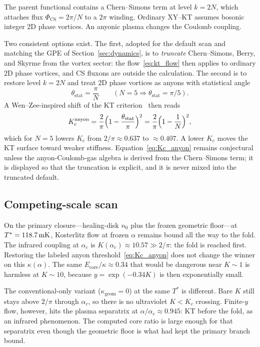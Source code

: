 The parent functional contains a Chern--Simons term at level $k=2N$, which attaches flux $\Phi_{\mathrm{CS}}=2\pi/N$ to a $2\pi$ winding. Ordinary XY--KT assumes bosonic integer 2D phase vortices. An anyonic plasma changes the Coulomb coupling.

Two consistent options exist. The first, adopted for the default scan and matching the GPE of Section~\ref{sec:dynamics}, is to \emph{truncate} Chern--Simons, Berry, and Skyrme from the vortex sector: the flow~\eqref{eq:kt_flow} then applies to ordinary 2D phase vortices, and CS fluxons are outside the calculation. The second is to restore level $k=2N$ and treat 2D phase vortices as anyons with statistical angle
\begin{equation}
\theta_{\mathrm{stat}}=\frac{\pi}{N}\qquad(N=5\Rightarrow \theta_{\mathrm{stat}}=\pi/5).
\label{eq:theta_stat}
\end{equation}
A Wen--Zee-inspired shift of the KT criterion~\cite{WenZee1992,Wen1995} then reads
\begin{equation}
K_c^{\mathrm{anyon}}=\frac{2}{\pi}\Bigl(1-\frac{\theta_{\mathrm{stat}}}{\pi}\Bigr)^2
=\frac{2}{\pi}\Bigl(1-\frac{1}{N}\Bigr)^2,
\label{eq:Kc_anyon}
\end{equation}
which for $N=5$ lowers $K_c$ from $2/\pi\approx 0.637$ to $\approx 0.407$. A lower $K_c$ moves the KT surface toward weaker stiffness. Equation~\eqref{eq:Kc_anyon} remains conjectural unless the anyon-Coulomb-gas algebra is derived from the \TQGL{} Chern--Simons term; it is displayed so that the truncation is explicit, and it is never mixed into the truncated default.

\subsection{Competing-scale scan}
\label{sec:vrg_python}

On the primary closure---healing-disk $n_0$ plus the frozen geometric floor---at $T^*=118.7\,\mathrm{mK}$, Kosterlitz flow at frozen $\alpha$ remains bound all the way to the fold. The infrared coupling at $\alpha_c$ is $K(\alpha_c)\approx 10.57\gg 2/\pi$: the fold is reached first. Restoring the labeled anyon threshold~\eqref{eq:Kc_anyon} does not change the winner on this $\kappa(\alpha)$. The same $E_{\mathrm{core}}/\kappa\approx 0.34$ that would be dangerous near $K\sim 1$ is harmless at $K\sim 10$, because $y=\exp(-0.34 K)$ is then exponentially small.

The conventional-only variant ($\kappa_{\mathrm{geom}}=0$) at the same $T^*$ is different. Bare $K$ still stays above $2/\pi$ through $\alpha_c$, so there is no ultraviolet $K<K_c$ crossing. Finite-$y$ flow, however, hits the plasma separatrix at $\alpha/\alpha_c\approx 0.945$: KT before the fold, as an infrared phenomenon. The computed core ratio is large enough for that separatrix even though the geometric floor is what had kept the primary branch bound.

